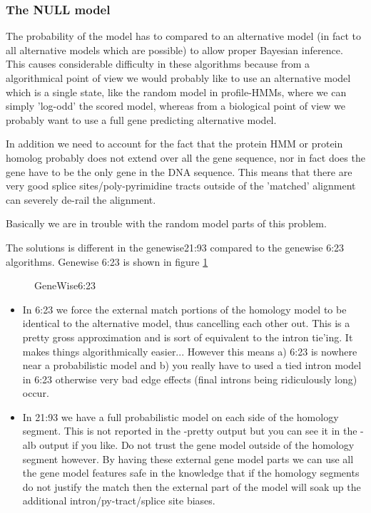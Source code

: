 \documentclass{article}
\begin{document}
\subsubsection{The NULL model}

The probability of the model has to compared to an alternative model
(in fact to all alternative models which are possible) to allow proper
Bayesian inference. This causes considerable difficulty in these
algorithms because from a algorithmical point of view we would
probably like to use an alternative model which is a single state,
like the random model in profile-HMMs, where we can simply 'log-odd'
the scored model, whereas from a biological point of view we probably
want to use a full gene predicting alternative model.

In addition we need to account for the fact that the protein HMM or
protein homolog probably does not extend over all the gene sequence,
nor in fact does the gene have to be the only gene in the DNA
sequence. This means that there are very good splice
sites/poly-pyrimidine tracts outside of the 'matched' alignment can
severely de-rail the alignment.

Basically we are in trouble with the random model parts of this
problem.

The solutions is different in the genewise21:93 compared to the genewise 6:23
algorithms. Genewise 6:23 is shown in figure \ref{Figure:genewise623}

\begin{figure}
\begin{center}
\leavevmode  
\epsfxsize 300pt
\newline     
\caption{GeneWise6:23}
\label{Figure:genewise623}
\end{center} 
\end{figure} 

\begin{itemize}
\item In 6:23 we force the external match portions of the homology
model to be identical to the alternative model, thus cancelling each
other out. This is a pretty gross approximation and is sort of
equivalent to the intron tie'ing. It makes things algorithmically
easier... However this means a) 6:23 is nowhere near a probabilistic
model and b) you really have to used a tied intron model in 6:23
otherwise very bad edge effects (final introns being ridiculously
long) occur.  
\item In 21:93 we have a full probabilistic model on each side
of the homology segment. This is not reported in the -pretty output
but you can see it in the -alb output if you like. Do not trust the
gene model outside of the homology segment however. By having these
external gene model parts we can use all the gene model features safe
in the knowledge that if the homology segments do not justify the
match then the external part of the model will soak up the additional
intron/py-tract/splice site biases.
\end{itemize}
\end{document}
